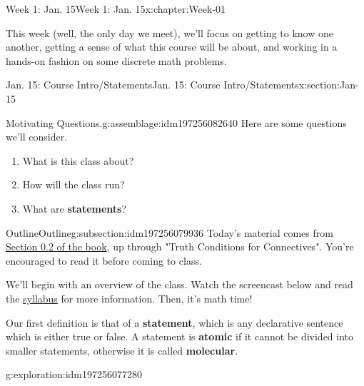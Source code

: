 \documentclass[oneside,10pt,]{book}
\newcommand{\terminology}[1]{\textbf{#1}}
\numberwithin{equation}{section}
\begin{document}
\begin{chapterptx}{Week 1: Jan. 15}{}{Week 1: Jan. 15}{}{}{x:chapter:Week-01}
\begin{introduction}{}%
This week (well, the only day we meet), we'll focus on getting to know one another, getting a sense of what this course will be about, and working in a hands-on fashion on some discrete math problems.%
\end{introduction}%
%
%
\typeout{************************************************}
\typeout{************************************************}
%
\begin{sectionptx}{Jan. 15: Course Intro\slash{}Statements}{}{Jan. 15: Course Intro\slash{}Statements}{}{}{x:section:Jan-15}
\begin{introduction}{}%
\begin{assemblage}{Motivating Questions.}{g:assemblage:idm197256082640}%
Here are some questions we'll consider. %
\begin{enumerate}
\item{}What is this class about?%
\item{}How will the class run?%
\item{}What are \terminology{statements}?%
\end{enumerate}
%
\end{assemblage}
\end{introduction}%
%
%
\typeout{************************************************}
\typeout{************************************************}
%
\begin{subsectionptx}{Outline}{}{Outline}{}{}{g:subsection:idm197256079936}
Today's material comes from \href{http://discrete.openmathbooks.org/dmoi3/sec_intro-statements.html}{Section 0.2 of the book}, up through "Truth Conditions for Connectives". You're encouraged to read it before coming to class.%
\par
We'll begin with an overview of the class. Watch the screencast below and read the \href{https://prof.mkjanssen.org/ds}{syllabus} for more information. Then, it's math time!%
\par
{} Our first definition is that of a \terminology{statement}, which is any declarative sentence which is either true or false. A statement is \terminology{atomic} if it cannot be divided into smaller statements, otherwise it is called \terminology{molecular}.%
\begin{exploration}{}{g:exploration:idm197256077280}%

\end{exploration}
\end{subsectionptx}
\end{sectionptx}
\end{chapterptx}
\end{document}
